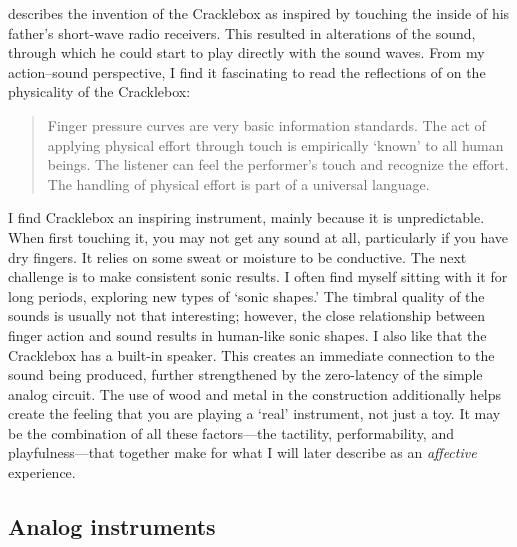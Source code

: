 \citet{waisvisz_crackle_2004} describes the invention of the Cracklebox as inspired by touching the inside of his father's short-wave radio receivers. This resulted in alterations of the sound, through which he could start to play directly with the sound waves. From my action--sound perspective, I find it fascinating to read the reflections of \citet{waisvisz_crackle_2004} on the physicality of the Cracklebox:

\begin{quotation}
Finger pressure curves are very basic information standards. The act of applying physical effort through touch is empirically `known' to all human beings. The listener can feel the performer's touch and recognize the effort. The handling of physical effort is part of a universal language.
\end{quotation}

I find Cracklebox an inspiring instrument, mainly because it is unpredictable. When first touching it, you may not get any sound at all, particularly if you have dry fingers. It relies on some sweat or moisture to be conductive. The next challenge is to make consistent sonic results. I often find myself sitting with it for long periods, exploring new types of `sonic shapes.' The timbral quality of the sounds is usually not that interesting; however, the close relationship between finger action and sound results in human-like sonic shapes. I also like that the Cracklebox has a built-in speaker. This creates an immediate connection to the sound being produced, further strengthened by the zero-latency of the simple analog circuit. The use of wood and metal in the construction additionally helps create the feeling that you are playing a `real' instrument, not just a toy. It may be the combination of all these factors---the tactility, performability, and playfulness---that together make for what I will later describe as an \emph{affective} experience.


\subsection{Analog instruments}

